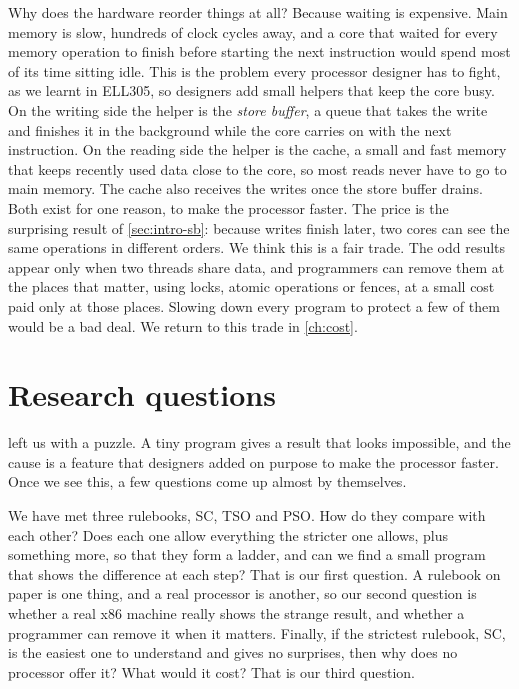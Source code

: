 Why does the hardware reorder things at all? Because waiting is expensive. Main memory is slow, hundreds of clock cycles away, and a core that waited for every memory operation to finish before starting the next instruction would spend most of its time sitting idle. This is the problem every processor designer has to fight, as we learnt in ELL305, so designers add small helpers that keep the core busy. On the writing side the helper is the \emph{store buffer}, a queue that takes the write and finishes it in the background while the core carries on with the next instruction. On the reading side the helper is the cache, a small and fast memory that keeps recently used data close to the core, so most reads never have to go to main memory. The cache also receives the writes once the store buffer drains. Both exist for one reason, to make the processor faster. The price is the surprising result of \cref{sec:intro-sb}: because writes finish later, two cores can see the same operations in different orders. We think this is a fair trade. The odd results appear only when two threads share data, and programmers can remove them at the places that matter, using locks, atomic operations or fences, at a small cost paid only at those places. Slowing down every program to protect a few of them would be a bad deal. We return to this trade in \cref{ch:cost}.

\section{Research questions}
\label{sec:rq}

 left us with a puzzle. A tiny program gives a result that looks impossible, and the cause is a feature that designers added on purpose to make the processor faster. Once we see this, a few questions come up almost by themselves.

We have met three rulebooks, SC, TSO and PSO. How do they compare with each other? Does each one allow everything the stricter one allows, plus something more, so that they form a ladder, and can we find a small program that shows the difference at each step? That is our first question. A rulebook on paper is one thing, and a real processor is another, so our second question is whether a real x86 machine really shows the strange result, and whether a programmer can remove it when it matters. Finally, if the strictest rulebook, SC, is the easiest one to understand and gives no surprises, then why does no processor offer it? What would it cost? That is our third question.

